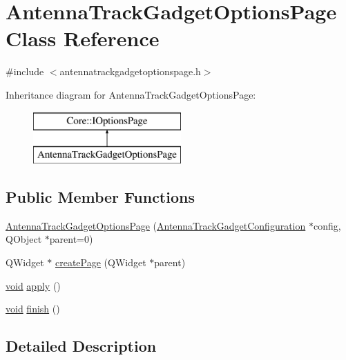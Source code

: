 \hypertarget{class_antenna_track_gadget_options_page}{\section{\-Antenna\-Track\-Gadget\-Options\-Page \-Class \-Reference}
\label{class_antenna_track_gadget_options_page}
}


{\ttfamily \#include $<$antennatrackgadgetoptionspage.\-h$>$}

\-Inheritance diagram for \-Antenna\-Track\-Gadget\-Options\-Page\-:\begin{figure}[H]
\begin{center}
\leavevmode
\includegraphics[height=2.000000cm]{class_antenna_track_gadget_options_page}
\end{center}
\end{figure}
\subsection*{\-Public \-Member \-Functions}
\begin{DoxyCompactItemize}
\item 
\hyperlink{group___antenna_track_gadget_plugin_gaf422edb8885c7e52f91e53e8671ca7e7}{\-Antenna\-Track\-Gadget\-Options\-Page} (\hyperlink{class_antenna_track_gadget_configuration}{\-Antenna\-Track\-Gadget\-Configuration} $\ast$config, \-Q\-Object $\ast$parent=0)
\item 
\-Q\-Widget $\ast$ \hyperlink{group___antenna_track_gadget_plugin_gab61c88a985c6dddb814fbd1dbb7a6455}{create\-Page} (\-Q\-Widget $\ast$parent)
\item 
\hyperlink{group___u_a_v_objects_plugin_ga444cf2ff3f0ecbe028adce838d373f5c}{void} \hyperlink{group___antenna_track_gadget_plugin_gae05ea679125a443f47b6835fb243c3fb}{apply} ()
\item 
\hyperlink{group___u_a_v_objects_plugin_ga444cf2ff3f0ecbe028adce838d373f5c}{void} \hyperlink{group___antenna_track_gadget_plugin_ga21f19cc8645a21200da9d3489a2a4bdf}{finish} ()
\end{DoxyCompactItemize}


\subsection{\-Detailed \-Description}


